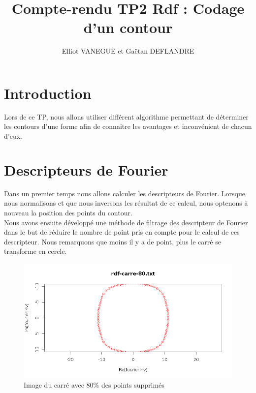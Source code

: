 \documentclass[11pt]{article}
\title{Compte-rendu TP2 Rdf : Codage d'un contour}
\author{Elliot VANEGUE et Gaëtan DEFLANDRE}
\begin{document}


  \maketitle
  
  \mbox{}
  \newpage
  \clearpage
  
  \section{Introduction}
  Lors de ce TP, nous allons utiliser différent algorithme permettant de déterminer
  les contours d'une forme afin de connaitre les avantages et inconvénient de chacun
  d'eux.
  
  \section{Descripteurs de Fourier}
  Dans un premier temps nous allons calculer les descripteurs de Fourier. Lorsque
  nous normalisons et que nous inversons les résultat de ce calcul, nous optenons
  à nouveau la position des points du contour.\\ 
  
  Nous avons ensuite développé une méthode de filtrage des descripteur de Fourier dans
  le but de réduire le nombre de point pris en compte pour le calcul de ces descripteur.
  Nous remarquons que moins il y a de point, plus le carré se transforme en cercle.
  
  \begin{center}
    \begin{figure}[!h]
      \includegraphics[width=15cm]{../resultat/carre-fourier-20.png}
      \caption{Image du carré avec 80\% des points supprimés}
    \end{figure}
  \end{center}
\end{document}
